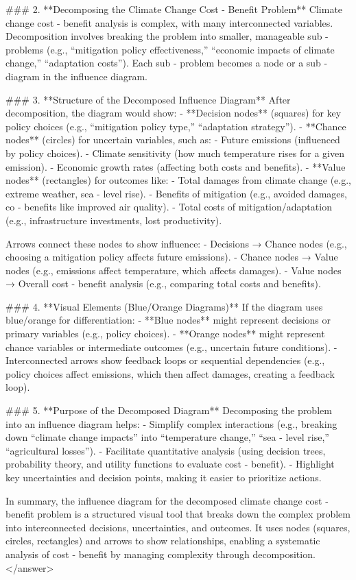### 2. **Decomposing the Climate Change Cost - Benefit Problem**  
Climate change cost - benefit analysis is complex, with many interconnected variables. Decomposition involves breaking the problem into smaller, manageable sub - problems (e.g., “mitigation policy effectiveness,” “economic impacts of climate change,” “adaptation costs”). Each sub - problem becomes a node or a sub - diagram in the influence diagram.  


### 3. **Structure of the Decomposed Influence Diagram**  
After decomposition, the diagram would show:  
- **Decision nodes** (squares) for key policy choices (e.g., “mitigation policy type,” “adaptation strategy”).  
- **Chance nodes** (circles) for uncertain variables, such as:  
  - Future emissions (influenced by policy choices).  
  - Climate sensitivity (how much temperature rises for a given emission).  
  - Economic growth rates (affecting both costs and benefits).  
- **Value nodes** (rectangles) for outcomes like:  
  - Total damages from climate change (e.g., extreme weather, sea - level rise).  
  - Benefits of mitigation (e.g., avoided damages, co - benefits like improved air quality).  
  - Total costs of mitigation/adaptation (e.g., infrastructure investments, lost productivity).  

Arrows connect these nodes to show influence:  
- Decisions → Chance nodes (e.g., choosing a mitigation policy affects future emissions).  
- Chance nodes → Value nodes (e.g., emissions affect temperature, which affects damages).  
- Value nodes → Overall cost - benefit analysis (e.g., comparing total costs and benefits).  


### 4. **Visual Elements (Blue/Orange Diagrams)**  
If the diagram uses blue/orange for differentiation:  
- **Blue nodes** might represent decisions or primary variables (e.g., policy choices).  
- **Orange nodes** might represent chance variables or intermediate outcomes (e.g., uncertain future conditions).  
- Interconnected arrows show feedback loops or sequential dependencies (e.g., policy choices affect emissions, which then affect damages, creating a feedback loop).  


### 5. **Purpose of the Decomposed Diagram**  
Decomposing the problem into an influence diagram helps:  
- Simplify complex interactions (e.g., breaking down “climate change impacts” into “temperature change,” “sea - level rise,” “agricultural losses”).  
- Facilitate quantitative analysis (using decision trees, probability theory, and utility functions to evaluate cost - benefit).  
- Highlight key uncertainties and decision points, making it easier to prioritize actions.  


In summary, the influence diagram for the decomposed climate change cost - benefit problem is a structured visual tool that breaks down the complex problem into interconnected decisions, uncertainties, and outcomes. It uses nodes (squares, circles, rectangles) and arrows to show relationships, enabling a systematic analysis of cost - benefit by managing complexity through decomposition.</answer>